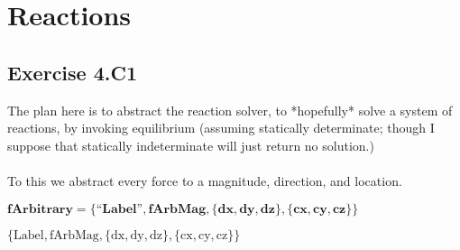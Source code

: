 \documentclass{article}
\begin{document}
\section*{Reactions}

\subsection*{Exercise 4.C1}

The plan here is to abstract the reaction solver, to *hopefully* solve a system of reactions, by invoking equilibrium (assuming statically determinate;
though I suppose that statically indeterminate will just return no solution.)\\
\\
To this we abstract every force to a magnitude, direction, and location.

\begin{doublespace}
\noindent\(\pmb{\text{fArbitrary}=\{\text{{``}Label{''}}, \text{fArbMag}, \{\text{dx}, \text{dy}, \text{dz}\}, \{\text{cx},\text{cy},\text{cz}\}\}}\)
\end{doublespace}

\begin{doublespace}
\noindent\(\{\text{Label},\text{fArbMag},\{\text{dx},\text{dy},\text{dz}\},\{\text{cx},\text{cy},\text{cz}\}\}\)
\end{doublespace}
\end{document}
